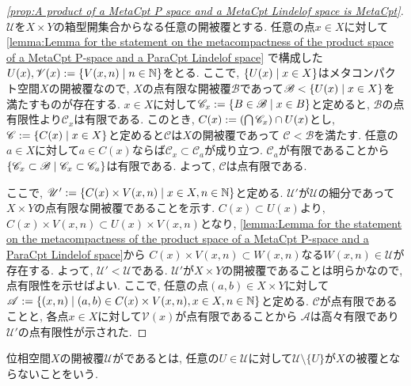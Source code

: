 \documentclass[uplatex, dvipdfmx, a4paper, 12pt, class=jsbook, crop=false]{standalone}
\begin{document}
\begin{proof}[\cref{prop:A product of a MetaCpt P space and a MetaCpt Lindelof space is MetaCpt}]
	$ \mathscr{U} $を$ X \times Y $の箱型開集合からなる任意の開被覆とする. 
	任意の点$ x \in X $に対して
	\cref{lemma:Lemma for the statement on the metacompactness of the product space of a MetaCpt P-space and a ParaCpt Lindelof space}
	で構成した$ U(x), \mathscr{V}(x) \defeq \setcomp{V(x, n)}{n \in \N} $をとる. 
	ここで, $ \setcomp{U(x)}{x \in X} $はメタコンパクト空間$ X $の開被覆なので, 
	$ X $の点有限な開被覆$ \mathscr{B} $であって$ \mathscr{B} < \setcomp{U(x)}{x \in X} $を満たすものが存在する. 
	$ x \in X $に対して$ \mathscr{C}_x \defeq \setcomp{B \in \mathscr{B}}{x \in B} $と定めると, 
	$ \mathscr{B} $の点有限性より$ \mathscr{C}_x $は有限である. 
	このとき, $ C(x) \mathrel{:=} \left(\bigcap \mathscr{C}_x \right) \cap U(x) $とし, 
	$ \mathscr{C} \defeq \setcomp{C(x)}{x \in X} $と定めると$ \mathscr{C} $は$ X $の開被覆であって
	$ \mathscr{C} < \mathscr{B} $を満たす. 
	任意の$ a \in X $に対して$ a \in C(x) $ならば$ \mathscr{C}_x \subset \mathscr{C}_a $が成り立つ. 
	$ \mathscr{C}_a $が有限であることから
	$ \setcomp{\mathscr{C}_x \subset \mathscr{B}}{\mathscr{C}_x \subset \mathscr{C}_a} $は有限である. 
	よって, $ \mathscr{C} $は点有限である. 

	ここで, $ \mathscr{U}' \defeq \setcomp{C(x) \times V(x, n)}{x \in X, n \in \N} $と定める. 
	$ \mathscr{U}' $が$ \mathscr{U} $の細分であって$ X \times Y $の点有限な開被覆であることを示す. 
	$ C(x) \subset U(x) $より, $ C(x) \times V(x, n) \subset U(x) \times V(x, n)$となり, 
	\cref{lemma:Lemma for the statement on the metacompactness of the product space of a MetaCpt P-space and a ParaCpt Lindelof space}から
	$ C(x) \times V(x, n) \subset W(x, n) $なる$ W(x, n) \in \mathscr{U} $が存在する. 
	よって, $ \mathscr{U}' < \mathscr{U} $である. 
	$ \mathscr{U}' $が$ X \times Y $の開被覆であることは明らかなので, 点有限性を示せばよい. 
	ここで, 任意の点$ (a, b) \in X \times Y $に対して
	$ \mathscr{A} \defeq \setcomp{(x, n)}{(a, b) \in C(x) \times V(x, n), x \in X, n \in \N} $と定める. 
	$ \mathscr{C} $が点有限であることと, 各点$ x \in X $に対して$ \mathscr{V}(x) $が点有限であることから
	$ \mathscr{A} $は高々有限であり$ \mathscr{U}' $の点有限性が示された.
\end{proof}

\begin{definition}
	位相空間$ X $の開被覆$ \mathscr{U} $がであるとは, 
	任意の$ U \in \mathscr{U} $に対して$ \mathscr{U} \setminus \{U\} $が$ X $の被覆とならないことをいう.
\end{definition}
\end{document}
